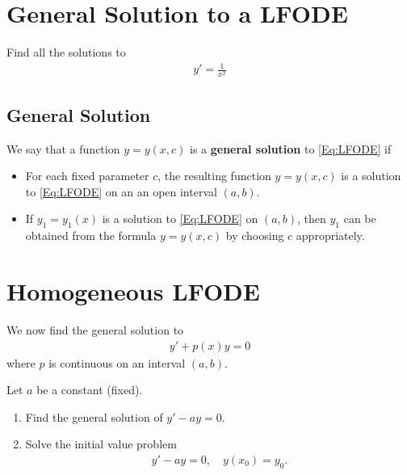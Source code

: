 \documentclass[12pt,a4paper]{article}
\newcounter{example}[section]
\begin{document}
\newpage

\section{General Solution to a LFODE}

\begin{example}
Find all the solutions to
	\begin{align*}
	y' = \frac{1}{x^2}
	\end{align*}
\end{example}

\vfill

\subsection{General Solution}

We say that a function $y = y(x, c)$ is a \textbf{general solution} to \eqref{Eq:LFODE} if
	\begin{itemize}
	\item For each fixed parameter $c$, the resulting function $y = y(x, c)$ is a solution to \eqref{Eq:LFODE} on an an open interval $(a, b)$.
	\item If $y_1 = y_1 (x)$ is a solution to \eqref{Eq:LFODE} on $(a, b)$, then $y_1$ can be obtained from the formula $y = y (x, c)$ by choosing $c$ appropriately.
	\end{itemize}
	
\vfill

\newpage

\section{Homogeneous LFODE}

We now find the general solution to
	\begin{align}
	y' + p(x) y = 0 \label{Eq:HLFODE}
	\end{align}
where $p$ is continuous on an interval $(a, b)$.

\vspace*{16pt}

\begin{example}
Let $a$ be a constant (fixed).
	\begin{enumerate}
	\item Find the general solution of $y'- a y = 0$.
	\item Solve the initial value problem
		\begin{align*}
		y' - ay = 0 , \quad y(x_0) = y_0 .
		\end{align*}
	\end{enumerate}
\end{example}
\end{document}
